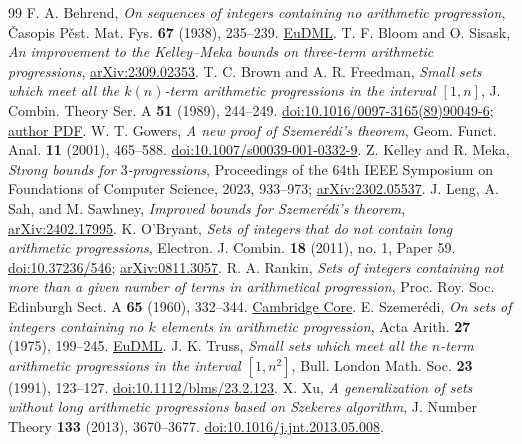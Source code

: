 \documentclass[10pt,a4paper]{amsart}
\numberwithin{equation}{section}
\begin{document}
\begin{thebibliography}{99}
 F. A. Behrend, \emph{On sequences of integers containing no arithmetic progression}, \v{C}asopis P\v{e}st. Mat. Fys. \textbf{67} (1938), 235--239. \href{https://eudml.org/doc/25161}{EuDML}.
 T. F. Bloom and O. Sisask, \emph{An improvement to the Kelley--Meka bounds on three-term arithmetic progressions}, \href{https://arxiv.org/abs/2309.02353}{arXiv:2309.02353}.
 T. C. Brown and A. R. Freedman, \emph{Small sets which meet all the $k(n)$-term arithmetic progressions in the interval $[1,n]$}, J. Combin. Theory Ser. A \textbf{51} (1989), 244--249. \href{https://doi.org/10.1016/0097-3165(89)90049-6}{doi:10.1016/0097-3165(89)90049-6}; \href{https://www.sfu.ca/~vjungic/tbrown/tom-38.pdf}{author PDF}.
 W. T. Gowers, \emph{A new proof of Szemer\'edi's theorem}, Geom. Funct. Anal. \textbf{11} (2001), 465--588. \href{https://doi.org/10.1007/s00039-001-0332-9}{doi:10.1007/s00039-001-0332-9}.
 Z. Kelley and R. Meka, \emph{Strong bounds for $3$-progressions}, Proceedings of the 64th IEEE Symposium on Foundations of Computer Science, 2023, 933--973; \href{https://arxiv.org/abs/2302.05537}{arXiv:2302.05537}.
 J. Leng, A. Sah, and M. Sawhney, \emph{Improved bounds for Szemer\'edi's theorem}, \href{https://arxiv.org/abs/2402.17995}{arXiv:2402.17995}.
 K. O'Bryant, \emph{Sets of integers that do not contain long arithmetic progressions}, Electron. J. Combin. \textbf{18} (2011), no. 1, Paper 59. \href{https://doi.org/10.37236/546}{doi:10.37236/546}; \href{https://arxiv.org/abs/0811.3057}{arXiv:0811.3057}.
 R. A. Rankin, \emph{Sets of integers containing not more than a given number of terms in arithmetical progression}, Proc. Roy. Soc. Edinburgh Sect. A \textbf{65} (1960), 332--344. \href{https://www.cambridge.org/core/journals/proceedings-of-the-royal-society-of-edinburgh-section-a-mathematics/article/xxivsets-of-integers-containing-not-more-than-a-given-number-of-terms-in-arithmetical-progression/7CB49707304932619FC2F3FB4A6BDE81}{Cambridge Core}.
 E. Szemer\'edi, \emph{On sets of integers containing no $k$ elements in arithmetic progression}, Acta Arith. \textbf{27} (1975), 199--245. \href{https://eudml.org/doc/205339}{EuDML}.
 J. K. Truss, \emph{Small sets which meet all the $n$-term arithmetic progressions in the interval $[1,n^2]$}, Bull. London Math. Soc. \textbf{23} (1991), 123--127. \href{https://doi.org/10.1112/blms/23.2.123}{doi:10.1112/blms/23.2.123}.
 X. Xu, \emph{A generalization of sets without long arithmetic progressions based on Szekeres algorithm}, J. Number Theory \textbf{133} (2013), 3670--3677. \href{https://doi.org/10.1016/j.jnt.2013.05.008}{doi:10.1016/j.jnt.2013.05.008}.
\end{thebibliography}
\end{document}
